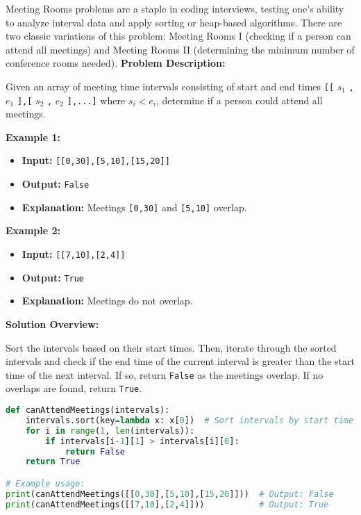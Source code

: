 
Meeting Rooms problems are a staple in coding interviews, testing one's ability to analyze interval data and apply sorting or heap-based algorithms. There are two classic variations of this problem: Meeting Rooms I (checking if a person can attend all meetings) and Meeting Rooms II (determining the minimum number of conference rooms needed).
\textbf{Problem Description:}

Given an array of meeting time intervals consisting of start and end times \texttt{[[} \(s_1\) \texttt{,} \(e_1\) \texttt{],[} \(s_2\) \texttt{,} \(e_2\) \texttt{],...]} where \(s_i < e_i\), determine if a person could attend all meetings. 

\textbf{Example 1:}

\begin{itemize}
    \item \textbf{Input:} \texttt{[[0,30],[5,10],[15,20]]}
    \item \textbf{Output:} \texttt{False}
    \item \textbf{Explanation:} Meetings \texttt{[0,30]} and \texttt{[5,10]} overlap.
\end{itemize}

\textbf{Example 2:}

\begin{itemize}
    \item \textbf{Input:} \texttt{[[7,10],[2,4]]}
    \item \textbf{Output:} \texttt{True}
    \item \textbf{Explanation:} Meetings do not overlap.
\end{itemize}

\textbf{Solution Overview:}

Sort the intervals based on their start times. Then, iterate through the sorted intervals and check if the end time of the current interval is greater than the start time of the next interval. If so, return \texttt{False} as the meetings overlap. If no overlaps are found, return \texttt{True}.

\begin{lstlisting}[language=Python]
def canAttendMeetings(intervals):
    intervals.sort(key=lambda x: x[0])  # Sort intervals by start time
    for i in range(1, len(intervals)):
        if intervals[i-1][1] > intervals[i][0]:
            return False
    return True

# Example usage:
print(canAttendMeetings([[0,30],[5,10],[15,20]]))  # Output: False
print(canAttendMeetings([[7,10],[2,4]]))           # Output: True
\end{lstlisting}
